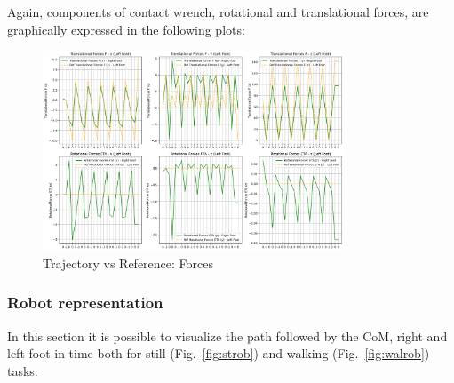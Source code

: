 \documentclass[main.tex]{subfiles}
\begin{document}
Again, components of contact wrench, rotational and translational forces, are graphically expressed in the following plots:
\begin{figure}[htbp]
    \centering
    \includegraphics[width=0.8\textwidth]{figures/contact_forces_walking.png}
    \caption{Trajectory vs Reference: Forces}
    \label{fig:contact_forces_walking}
\end{figure}

\newpage
\subsubsection*{Robot representation}
In this section it is possible to visualize the path followed by the CoM, right and left foot in time both for  still (Fig.~\ref{fig:strob}) and walking (Fig.~\ref{fig:walrob}) tasks:
\end{document}

